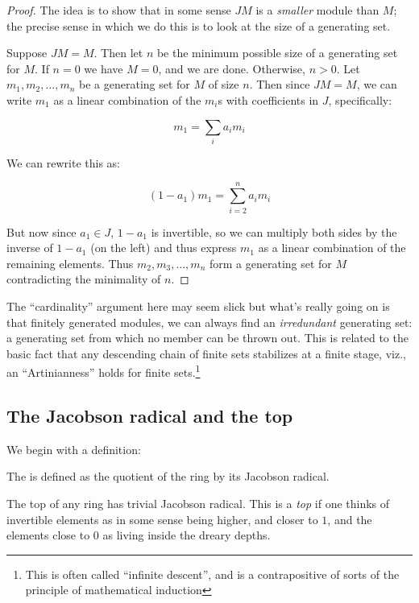 \documentclass[a4paper]{amsart}
\begin{document}
\begin{proof}
  The idea is to show that in some sense $JM$ is a {\em smaller}
  module than $M$; the precise sense in which we do this is to look at
  the size of a generating set.

  Suppose $JM = M$. Then let $n$ be the minimum possible size of a
  generating set for $M$. If $n = 0$ we have $M = 0$, and we are
  done. Otherwise, $n > 0$. Let $m_1, m_2, \ldots, m_n$ be a
  generating set for $M$ of size $n$. Then since $JM = M$, we can
  write $m_1$ as a linear combination of the $m_i$s with coefficients
  in $J$, specifically:

  $$m_1 = \sum_i a_im_i$$

  We can rewrite this as:

  $$(1 - a_1)m_1 = \sum_{i=2}^n a_im_i$$

  But now since $a_1 \in J$, $1 - a_1$ is invertible, so we can
  multiply both sides by the inverse of $1 - a_1$ (on the left) and
  thus express $m_1$ as a linear combination of the remaining
  elements. Thus $m_2, m_3, \ldots, m_n$ form a generating set for $M$
  contradicting the minimality of $n$.
\end{proof}

The ``cardinality'' argument here may seem slick but what's really
going on is that finitely generated modules, we can always find an
{\em irredundant} generating set: a generating set from which no
member can be thrown out. This is related to the basic fact that any
descending chain of finite sets stabilizes at a finite stage, viz., an
``Artinianness'' holds for finite sets.\footnote{This is often called
  ``infinite descent'', and is a contrapositive of sorts of the
  principle of mathematical induction}

\subsection{The Jacobson radical and the top}

We begin with a definition:

\begin{definer}
  The  is defined as the quotient of the
  ring by its Jacobson radical.
\end{definer}

The top of any ring has trivial Jacobson radical. This is a {\em top}
if one thinks of invertible elements as in some sense being higher,
and closer to $1$, and the elements close to $0$ as living inside the
dreary depths.
\end{document}
